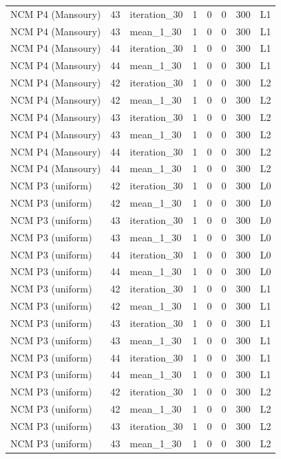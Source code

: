 \begin{table}[htbp!]
\begin{tabular}{lrlrrrrl}
NCM P4 (Mansoury) & 43 & iteration\_30 & 1 & 0 & 0 & 300 & L1 \\
NCM P4 (Mansoury) & 43 & mean\_1\_30 & 1 & 0 & 0 & 300 & L1 \\
NCM P4 (Mansoury) & 44 & iteration\_30 & 1 & 0 & 0 & 300 & L1 \\
NCM P4 (Mansoury) & 44 & mean\_1\_30 & 1 & 0 & 0 & 300 & L1 \\
NCM P4 (Mansoury) & 42 & iteration\_30 & 1 & 0 & 0 & 300 & L2 \\
NCM P4 (Mansoury) & 42 & mean\_1\_30 & 1 & 0 & 0 & 300 & L2 \\
NCM P4 (Mansoury) & 43 & iteration\_30 & 1 & 0 & 0 & 300 & L2 \\
NCM P4 (Mansoury) & 43 & mean\_1\_30 & 1 & 0 & 0 & 300 & L2 \\
NCM P4 (Mansoury) & 44 & iteration\_30 & 1 & 0 & 0 & 300 & L2 \\
NCM P4 (Mansoury) & 44 & mean\_1\_30 & 1 & 0 & 0 & 300 & L2 \\
NCM P3 (uniform) & 42 & iteration\_30 & 1 & 0 & 0 & 300 & L0 \\
NCM P3 (uniform) & 42 & mean\_1\_30 & 1 & 0 & 0 & 300 & L0 \\
NCM P3 (uniform) & 43 & iteration\_30 & 1 & 0 & 0 & 300 & L0 \\
NCM P3 (uniform) & 43 & mean\_1\_30 & 1 & 0 & 0 & 300 & L0 \\
NCM P3 (uniform) & 44 & iteration\_30 & 1 & 0 & 0 & 300 & L0 \\
NCM P3 (uniform) & 44 & mean\_1\_30 & 1 & 0 & 0 & 300 & L0 \\
NCM P3 (uniform) & 42 & iteration\_30 & 1 & 0 & 0 & 300 & L1 \\
NCM P3 (uniform) & 42 & mean\_1\_30 & 1 & 0 & 0 & 300 & L1 \\
NCM P3 (uniform) & 43 & iteration\_30 & 1 & 0 & 0 & 300 & L1 \\
NCM P3 (uniform) & 43 & mean\_1\_30 & 1 & 0 & 0 & 300 & L1 \\
NCM P3 (uniform) & 44 & iteration\_30 & 1 & 0 & 0 & 300 & L1 \\
NCM P3 (uniform) & 44 & mean\_1\_30 & 1 & 0 & 0 & 300 & L1 \\
NCM P3 (uniform) & 42 & iteration\_30 & 1 & 0 & 0 & 300 & L2 \\
NCM P3 (uniform) & 42 & mean\_1\_30 & 1 & 0 & 0 & 300 & L2 \\
NCM P3 (uniform) & 43 & iteration\_30 & 1 & 0 & 0 & 300 & L2 \\
NCM P3 (uniform) & 43 & mean\_1\_30 & 1 & 0 & 0 & 300 & L2 \\

\end{tabular}
\end{table}
